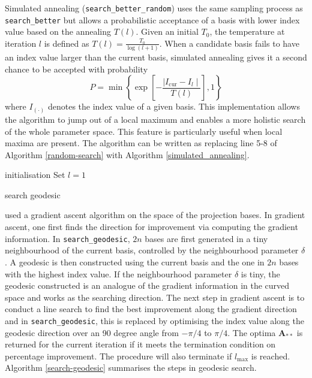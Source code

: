 \documentclass[12pt]{article}
\begin{document}
Simulated annealing (\texttt{search\_better\_random}) \citep[\citet{bertsimas1993simulated}]{kirkpatrick1983optimization} uses the same sampling process as \texttt{search\_better} but allows a probabilistic acceptance of a basis with lower index value based on the annealing \(T(l)\). Given an initial \(T_0\), the temperature at iteration \(l\) is defined as \(T(l) = \frac{T_0}{\log(l + 1)}\). When a candidate basis fails to have an index value larger than the current basis, simulated annealing gives it a second chance to be accepted with probability \[P= \min\left\{\exp\left[-\frac{\mid I_{\text{cur}} - I_{l} \mid}{T(l)}\right],1\right\}\] where \(I_{(\cdot)}\) denotes the index value of a given basis. This implementation allows the algorithm to jump out of a local maximum and enables a more holistic search of the whole parameter space. This feature is particularly useful when local maxima are present. The algorithm can be written as replacing line 5-8 of Algorithm \ref{random-search} with Algorithm \ref{simulated_annealing}.

\begin{algorithm}
\SetAlgoLined
{}
  initialisation\;
  Set $l = 1$\;
  \caption{search geodesic}
  \label{search-geodesic}
\end{algorithm}

\citet{cook1995grand} used a gradient ascent algorithm on the space of the projection bases. In gradient ascent, one first finds the direction for improvement via computing the gradient information. In \texttt{search\_geodesic}, \(2n\) bases are first generated in a tiny neighbourhood of the current basis, controlled by the neighbourhood parameter \(\delta\). A geodesic is then constructed using the current basis and the one in \(2n\) bases with the highest index value. If the neighbourhood parameter \(\delta\) is tiny, the geodesic constructed is an analogue of the gradient information in the curved space and works as the searching direction. The next step in gradient ascent is to conduct a line search to find the best improvement along the gradient direction and in \texttt{search\_geodesic}, this is replaced by optimising the index value along the geodesic direction over an 90 degree angle from \(-\pi/4\) to \(\pi/4\). The optima \(\mathbf{A}_{**}\) is returned for the current iteration if it meets the termination condition on percentage improvement. The procedure will also terminate if \(l_{\max}\) is reached. Algorithm \ref{search-geodesic} summarises the steps in geodesic search.
\end{document}
